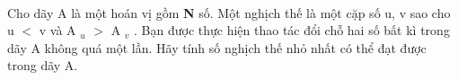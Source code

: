  

Cho dãy A là một hoán vị gồm \textbf{ N } số. Một nghịch thế là một cặp số u, v sao cho u $<$ v và A $_ u $ $>$ A $_ v $ . Bạn được thực hiện thao tác đổi chỗ hai số bất kì trong dãy A không quá một lần. Hãy tính số nghịch thế nhỏ nhất có thể đạt được trong dãy A.